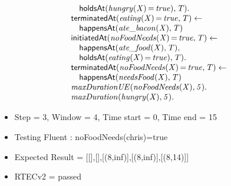 \documentclass[8pt]{beamer}
\DeclareMathOperator{\val}{=}  %
\def \patsize {}
\def\happensAt{\textsf{\patsize happensAt}}
\def\holdsAt{\textsf{\patsize holdsAt}}
\def\initiatedAt{\textsf{\patsize initiatedAt}}
\def\terminatedAt{\textsf{\patsize terminatedAt}}
\newenvironment{mysplit}%
  {\arraycolsep 0pt \begin{array}{l}}%
  {\end{array}}
\begin{document}
\begin{frame}
\begin{minipage}{0.55\linewidth}
\begin{align*}
\begin{mysplit}
                \quad    \holdsAt\mathit{(hungry(X)\val true),T).}\\
                \terminatedAt\mathit{(eating(X)\val true,T)\leftarrow}\\
                \quad    \happensAt\mathit{(ate\_bacon(X),T)}\\
                \initiatedAt\mathit{(noFoodNeeds(X)\val true,T)\leftarrow}\\
                \quad    \happensAt\mathit{(ate\_food(X),T),}\\
                \quad    \holdsAt\mathit{(eating(X)\val true),T).}\\
                \terminatedAt\mathit{(noFoodNeeds(X)\val true,T)\leftarrow}\\
                \quad    \happensAt\mathit{(needsFood(X),T)}\\
                \mathit{maxDurationUE(noFoodNeeds(X),5).}\\
                \mathit{maxDuration(hungry(X),5).}\\
            \end{mysplit}
        \end{align*}
    \end{minipage}
    \begin{itemize}
        \item  Step = 3, Window = 4, Time start = 0, Time end = 15
        \item Testing Fluent :  noFoodNeeds(chris)=true
        \item Expected Result = [[],[],[(8,inf)],[(8,inf)],[(8,14)]]
        \item RTECv2 = passed
    \end{itemize}
\end{frame}
\end{document}
